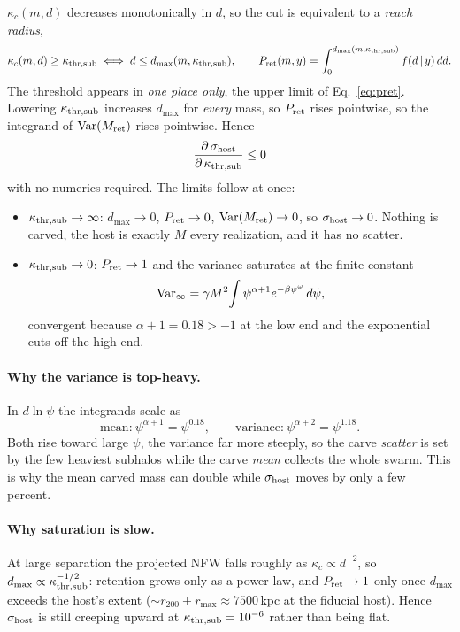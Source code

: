 \documentclass[11pt]{article}
\newcommand{\kthrs}{\kappa_{\rm thr,sub}}
\newcommand{\Mret}{M_{\rm ret}}
\newcommand{\Pret}{P_{\rm ret}}
\begin{document}
$\kappa_c(m,d)$ decreases monotonically in $d$, so the cut is equivalent to a
\emph{reach radius},
\begin{equation}
  \kappa_c(m,d)\ge\kthrs \iff d\le d_{\max}(m,\kthrs),
  \qquad
  \Pret(m,y)=\int_{0}^{d_{\max}(m,\kthrs)} f(d\,|\,y)\,dd .
  \label{eq:pret}
\end{equation}
The threshold appears in \emph{one place only}, the upper limit of Eq.~\eqref{eq:pret}.
Lowering $\kthrs$ increases $d_{\max}$ for \emph{every} mass, so $\Pret$ rises pointwise,
so the integrand of ${\rm Var}(\Mret)$ rises pointwise. Hence
\begin{equation}
  \frac{\partial\,\sigma_{\rm host}}{\partial\,\kthrs}\le 0
\end{equation}
with no numerics required. The limits follow at once:
\begin{itemize}
  \item $\kthrs\to\infty$: $d_{\max}\to0$, $\Pret\to0$, ${\rm Var}(\Mret)\to0$, so
        $\sigma_{\rm host}\to0$. Nothing is carved, the host is exactly $M$ every
        realization, and it has no scatter.
  \item $\kthrs\to0$: $\Pret\to1$ and the variance saturates at the finite constant
        \begin{equation}
          {\rm Var}_\infty=\gamma M^{2}\!\int \psi^{\alpha+1}e^{-\beta\psi^{\omega}}\,d\psi ,
        \end{equation}
        convergent because $\alpha+1=0.18>-1$ at the low end and the exponential cuts off
        the high end.
\end{itemize}

\paragraph{Why the variance is top-heavy.} In $d\ln\psi$ the integrands scale as
\begin{equation}
  \text{mean:}\ \psi^{\alpha+1}=\psi^{0.18},
  \qquad
  \text{variance:}\ \psi^{\alpha+2}=\psi^{1.18}.
\end{equation}
Both rise toward large $\psi$, the variance far more steeply, so the carve \emph{scatter}
is set by the few heaviest subhalos while the carve \emph{mean} collects the whole swarm.
This is why the mean carved mass can double while $\sigma_{\rm host}$ moves by only a few
percent.

\paragraph{Why saturation is slow.} At large separation the projected NFW falls roughly as
$\kappa_c\propto d^{-2}$, so $d_{\max}\propto\kthrs^{-1/2}$: retention grows only as a power
law, and $\Pret\to1$ only once $d_{\max}$ exceeds the host's extent
($\sim r_{200}+r_{\max}\approx7500\,$kpc at the fiducial host). Hence $\sigma_{\rm host}$ is
still creeping upward at $\kthrs=10^{-6}$ rather than being flat.
\end{document}
